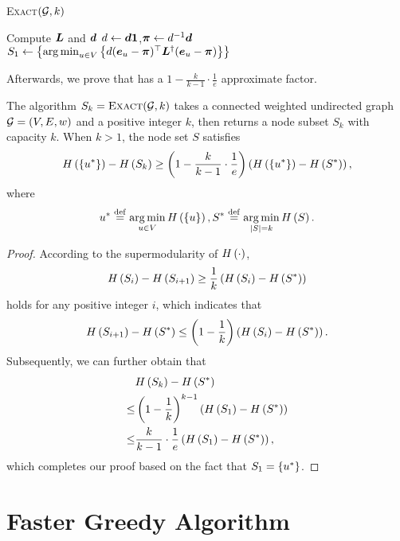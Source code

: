 \documentclass[sigconf]{acmart}
\begin{document}
\begin{algorithm}
  \caption{\textsc{Exact}\((\mathcal{G},k)\)}
  \label{algo:exact}
  Compute \(\boldsymbol{L}\) and \(\boldsymbol{d}\)\;
  \(d\gets\boldsymbol{d}\boldsymbol{1}\),\(\boldsymbol{\pi}\gets d^{-1}\boldsymbol{d}\)\;
  \(S_1\gets\left\{\operatorname*{arg\,min}_{u\in V}\left\{d(\boldsymbol{e}_u-\boldsymbol{\pi})^\top\boldsymbol{L}^\dagger(\boldsymbol{e}_u-\boldsymbol{\pi}) \right\} \right\}\)\;
\end{algorithm}

Afterwards, we prove that  has a \(1-\frac{k}{k-1}\cdot\frac{1}{e}\) approximate factor.
\begin{theorem}
  The algorithm \(S_k=\textsc{Exact}(\mathcal{G},k)\) takes a connected weighted undirected graph \(\mathcal{G}=(V,E,w)\) and a positive integer \(k\), then returns a node subset \(S_k\) with capacity \(k\).
  When \(k>1\), the node set \(S\) satisfies
  \[H\left(\left\{u^* \right\}\right)-H\left(S_k\right)\ge\left( 1-\frac{k}{k-1}\cdot\frac{1}{e} \right)\left( H\left(\left\{u^* \right\}\right)-H\left(S^*\right) \right),\]
  where
  \[u^*\stackrel{\mathrm{def}}{=}\operatorname*{arg\,min}_{u\in V}H\left(\left\{u \right\}\right),S^*\stackrel{\mathrm{def}}{=}\operatorname*{arg\,min}_{\left|S \right|=k}H\left(S\right).\]
\end{theorem}
\begin{proof}
  According to the supermodularity of \(H\left(\cdot\right)\),
  \[H\left(S_i\right)-H\left(S_{i+1}\right)\ge\frac{1}{k}\left( H\left(S_i\right)-H\left(S^*\right) \right)\]
  holds for any positive integer \(i\), which indicates that
  \[H\left(S_{i+1}\right)-H\left(S^*\right)\le\left( 1-\frac{1}{k} \right)\left( H\left(S_i\right)-H\left(S^*\right) \right).\]
  Subsequently, we can further obtain that
  \begin{align*}
        & H\left(S_k\right)-H\left(S^*\right)                                       \\
    \le & \left( 1-\frac{1}{k} \right)^{k-1}\left( H\left(S_1\right)-H\left(S^*\right) \right)    \\
    \le & \frac{k}{k-1}\cdot\frac{1}{e}\left( H\left(S_1\right)-H\left(S^*\right) \right),
  \end{align*}
  which completes our proof based on the fact that \(S_1=\left\{u^* \right\}\).
\end{proof}

\section{Faster Greedy Algorithm}\label{sec:faster-greedy}
\end{document}
